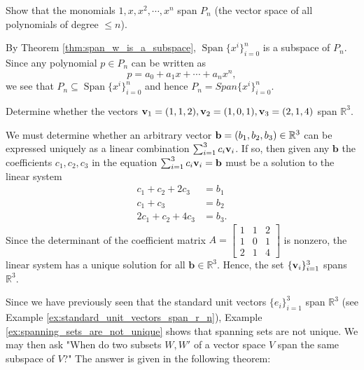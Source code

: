 \documentclass[12pt,letterpaper,reqno]{article}
\numberwithin{equation}{section}
\DeclareMathOperator{\Span}{Span}
\newcommand{\fixme}[1]{{\color{orange}{[#1]}}}
\begin{document}
\begin{exercise}\label{ex:monomials_span_p_n}
Show that the monomials	$1,x,x^2,\cdots,x^n$ span $P_n$ (the vector space of all polynomials of degree $\leq n$).
\end{exercise}


{\color{red}\begin{solution}
	 By Theorem \ref{thm:span_w_is_a_subspace}, $\Span\{x^i\}_{i=0}^n$ is a subspace of $P_n$. Since any polynomial $p \in P_n$ can be written as
$$p=a_0+a_1x+\cdots+a_nx^n,$$
we see that $P_n \subseteq \Span \{x^i\}_{i=0}^n$ and hence $P_n=Span\{x^i\}_{i=0}^n$.
\end{solution}}

\fixme{Hold of on this next example until we have more theory?} 

\begin{example}\label{ex:spanning_sets_are_not_unique}
Determine whether the vectors ${\bf v}_1=(1,1,2), {\bf v}_2=(1,0,1), {\bf v}_3=(2,1,4)$ span $\mathbb{R}^3$. \\
{\color{red} 
\begin{solution}
	We must determine whether an arbitrary vector ${\bf b}=(b_1,b_2,b_3) \in \mathbb{R}^3$ can be expressed uniquely as a linear combination $\sum_{i=1}^3c_i{\bf v}_i$. If so, then given any $\mathbf{b}$ the coefficients $c_1,c_2,c_3$ in the equation $\sum_{i=1}^3c_i{\bf v}_i=\mathbf{b}$ must be a solution to the linear system
	\begin{align*}
	c_1+c_2+2c_3 &=b_1 \\
	c_1+c_3 &=b_2 \\
	2c_1+c_2+4c_3 &=b_3.
\end{align*} 
Since the determinant of the coefficient matrix $A=\begin{bmatrix}
	1 & 1 & 2 \\ 1 & 0 & 1 \\ 2 & 1 & 4
\end{bmatrix}$ is nonzero, the linear system has a unique solution for all $\mathbf{b} \in \mathbb{R}^3$. Hence, the set $\{{\bf v}_i\}_{i=1}^3$ spans $\mathbb{R}^3$.
\end{solution}}	
\end{example}

Since we have previously seen that the standard unit vectors $\{e_i\}_{i=1}^3$ span $\mathbb{R}^3$ (see Example \ref{ex:standard_unit_vectors_span_r_n}), Example \ref{ex:spanning_sets_are_not_unique} shows that spanning sets are not unique. We may then ask "When do two subsets $W,W'$ of a vector space $V$ span the same subspace of $V$?" The answer is given in the following theorem:
\end{document}

